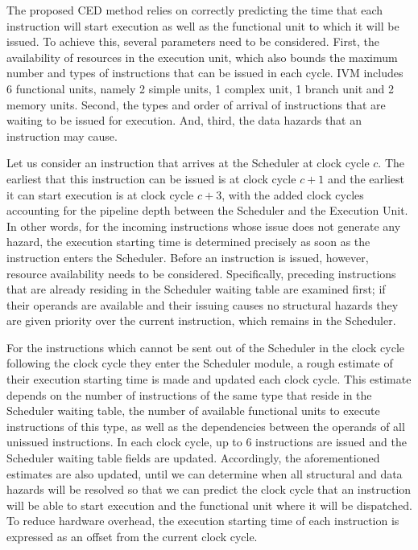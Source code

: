 \documentclass[12pt]{yalephd}
\begin{document}
The proposed CED method relies on correctly predicting the time that each instruction will start execution as well as the functional unit to which it will be issued. To achieve this, several parameters need to be considered. First, the availability of resources in the execution unit, which also bounds the maximum number and types of instructions that can be issued in each cycle. IVM includes 6 functional units, namely 2 simple units, 1 complex unit, 1 branch unit and 2 memory units. Second, the types and order of arrival of instructions that are waiting to be issued for execution. And, third, the data hazards that an instruction may cause.

Let us consider an instruction that arrives at the Scheduler at clock cycle $c$. The earliest that this instruction can be issued is at clock cycle $c+1$ and the earliest it can start execution is at clock cycle $c+3$, with the added clock cycles accounting for the pipeline depth between the Scheduler and the Execution Unit. In other words, for the incoming instructions whose issue does not generate any hazard, the execution starting time is determined precisely as soon as the instruction enters the Scheduler. Before an instruction is issued, however, resource availability needs to be considered. Specifically, preceding instructions that are already residing in the Scheduler waiting table are examined first; if their operands are available and their issuing causes no structural hazards they are given priority over the current instruction, which remains in the Scheduler.

For the instructions which cannot be sent out of the Scheduler in the clock cycle following the clock cycle they enter the Scheduler module, a rough estimate of their execution starting time is made and updated each clock cycle. This estimate depends on the number of instructions of the same type that reside in the Scheduler waiting table, the number of available functional units to execute instructions of this type, as well as the dependencies between the operands of all unissued instructions. In each clock cycle, up to 6 instructions are issued and the Scheduler waiting table fields are updated. Accordingly, the aforementioned estimates are also updated, until we can determine when all structural and data hazards will be resolved so that we can predict the clock cycle that an instruction will be able to start execution and the functional unit where it will be dispatched. To reduce hardware overhead, the execution starting time of each instruction is expressed as an offset from the current clock cycle.
\end{document}
